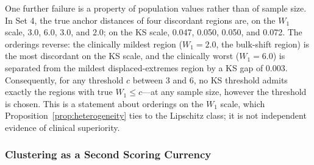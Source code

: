 \documentclass[AMA,Times1COL]{WileyNJDv5}
\begin{document}
One further failure is a property of population values rather than of sample size. In Set 4, the true anchor distances of four discordant regions are, on the $W_1$ scale, 3.0, 6.0, 3.0, and 2.0; on the KS scale, 0.047, 0.050, 0.050, and 0.072. The orderings reverse: the clinically mildest region ($W_1 = 2.0$, the bulk-shift region) is the most discordant on the KS scale, and the clinically worst ($W_1 = 6.0$) is separated from the mildest displaced-extremes region by a KS gap of 0.003. Consequently, for any threshold $c$ between 3 and 6, no KS threshold admits exactly the regions with true $W_1 \leq c$---at any sample size, however the threshold is chosen. This is a statement about orderings on the $W_1$ scale, which Proposition~\ref{prop:heterogeneity} ties to the Lipschitz class; it is not independent evidence of clinical superiority.

\subsubsection{Clustering as a Second Scoring Currency}\label{sec:study2_clustering}
\end{document}
